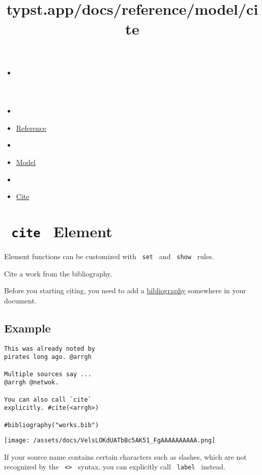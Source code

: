 \title{typst.app/docs/reference/model/cite}

\begin{itemize}
\tightlist
\item
  \href{/docs}{}
\item
  
\item
  \href{/docs/reference/}{Reference}
\item
  
\item
  \href{/docs/reference/model/}{Model}
\item
  
\item
  \href{/docs/reference/model/cite/}{Cite}
\end{itemize}

\section{\texorpdfstring{\texttt{\ cite\ } {{ Element
}}}{ cite   Element }}\label{summary}

\label{element-tooltip}
Element functions can be customized with \texttt{\ set\ } and
\texttt{\ show\ } rules.

Cite a work from the bibliography.

Before you starting citing, you need to add a
\href{/docs/reference/model/bibliography/}{bibliography} somewhere in
your document.

\subsection{Example}\label{example}

\begin{verbatim}
This was already noted by
pirates long ago. @arrgh

Multiple sources say ...
@arrgh @netwok.

You can also call `cite`
explicitly. #cite(<arrgh>)

#bibliography("works.bib")
\end{verbatim}

\texttt{[image: /assets/docs/VelsLOKdUATbBc5AK51\_FgAAAAAAAAAA.png]}

If your source name contains certain characters such as slashes, which
are not recognized by the \texttt{\ \textless{}\textgreater{}\ } syntax,
you can explicitly call \texttt{\ label\ } instead.

